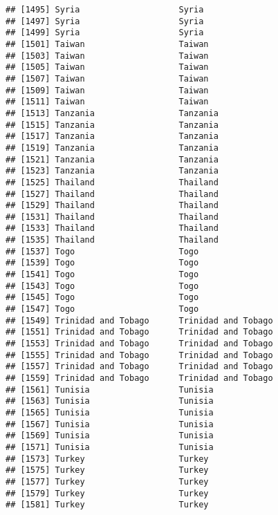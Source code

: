 \documentclass[]{article}
\begin{document}
\begin{verbatim}
## [1495] Syria                    Syria                   
## [1497] Syria                    Syria                   
## [1499] Syria                    Syria                   
## [1501] Taiwan                   Taiwan                  
## [1503] Taiwan                   Taiwan                  
## [1505] Taiwan                   Taiwan                  
## [1507] Taiwan                   Taiwan                  
## [1509] Taiwan                   Taiwan                  
## [1511] Taiwan                   Taiwan                  
## [1513] Tanzania                 Tanzania                
## [1515] Tanzania                 Tanzania                
## [1517] Tanzania                 Tanzania                
## [1519] Tanzania                 Tanzania                
## [1521] Tanzania                 Tanzania                
## [1523] Tanzania                 Tanzania                
## [1525] Thailand                 Thailand                
## [1527] Thailand                 Thailand                
## [1529] Thailand                 Thailand                
## [1531] Thailand                 Thailand                
## [1533] Thailand                 Thailand                
## [1535] Thailand                 Thailand                
## [1537] Togo                     Togo                    
## [1539] Togo                     Togo                    
## [1541] Togo                     Togo                    
## [1543] Togo                     Togo                    
## [1545] Togo                     Togo                    
## [1547] Togo                     Togo                    
## [1549] Trinidad and Tobago      Trinidad and Tobago     
## [1551] Trinidad and Tobago      Trinidad and Tobago     
## [1553] Trinidad and Tobago      Trinidad and Tobago     
## [1555] Trinidad and Tobago      Trinidad and Tobago     
## [1557] Trinidad and Tobago      Trinidad and Tobago     
## [1559] Trinidad and Tobago      Trinidad and Tobago     
## [1561] Tunisia                  Tunisia                 
## [1563] Tunisia                  Tunisia                 
## [1565] Tunisia                  Tunisia                 
## [1567] Tunisia                  Tunisia                 
## [1569] Tunisia                  Tunisia                 
## [1571] Tunisia                  Tunisia                 
## [1573] Turkey                   Turkey                  
## [1575] Turkey                   Turkey                  
## [1577] Turkey                   Turkey                  
## [1579] Turkey                   Turkey                  
## [1581] Turkey                   Turkey                  

\end{verbatim}
\end{document}
